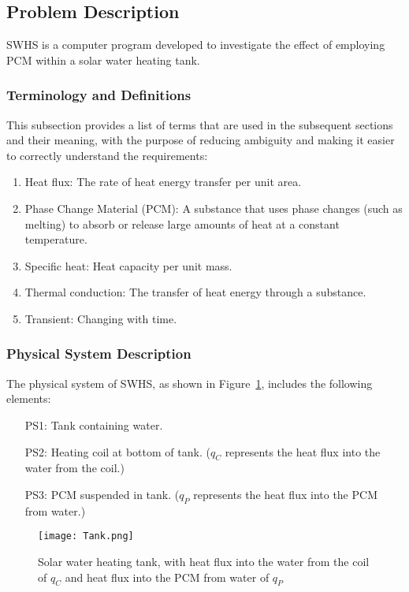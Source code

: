 \documentclass[12pt]{article}
\begin{document}
\subsection{Problem Description}
\label{Sec:PD}
SWHS is a computer program developed to investigate the effect of employing PCM within a solar water heating tank.
\subsubsection{Terminology and Definitions}
\label{Sec:TaD}
This subsection provides a list of terms that are used in the subsequent sections and their meaning, with the purpose of reducing ambiguity and making it easier to correctly understand the requirements:
\begin{enumerate}
\item{Heat flux: The rate of heat energy transfer per unit area.}
\item{Phase Change Material (PCM): A substance that uses phase changes (such as melting) to absorb or release large amounts of heat at a constant temperature.}
\item{Specific heat: Heat capacity per unit mass.}
\item{Thermal conduction: The transfer of heat energy through a substance.}
\item{Transient: Changing with time.}
\end{enumerate}
\subsubsection{Physical System Description}
\label{Sec:PSD}
The physical system of SWHS, as shown in Figure~\ref{Figure:Swht,whfitwftcoahfitPfwo}, includes the following elements:
\begin{itemize}
\item[PS1:]Tank containing water.
\item[PS2:]Heating coil at bottom of tank. ($q_{C}$ represents the heat flux into the water from the coil.)
\item[PS3:]PCM suspended in tank. ($q_{P}$ represents the heat flux into the PCM from water.)
\end{itemize}
\begin{figure}
\begin{center}
\texttt{[image: Tank.png]}
\caption{Solar water heating tank, with heat flux into the water from the coil of $q_{C}$ and heat flux into the PCM from water of $q_{P}$}
\label{Figure:Swht,whfitwftcoahfitPfwo}
\end{center}
\end{figure}
\end{document}
